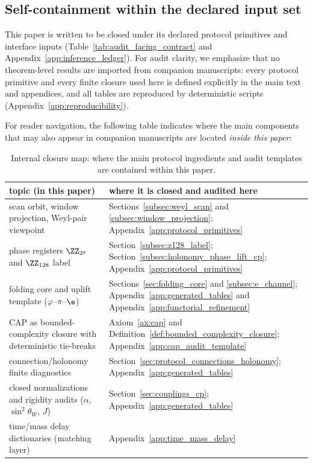\subsection{Self-containment within the declared input set}
This paper is written to be closed under its declared protocol primitives and interface inputs (Table~\ref{tab:audit_facing_contract} and Appendix~\ref{app:inference_ledger}).
For audit clarity, we emphasize that no theorem-level results are imported from companion manuscripts: every protocol primitive and every finite closure used here is defined explicitly in the main text and appendices, and all tables are reproduced by deterministic scripts (Appendix~\ref{app:reproducibility}).

For reader navigation, the following table indicates where the main components that may also appear in companion manuscripts are located \emph{inside this paper}:
\begin{table}[t]
\centering
\scriptsize
\setlength{\tabcolsep}{6pt}
\renewcommand{\arraystretch}{1.15}
\begin{tabular}{p{} p{}}
\toprule
topic (in this paper) & where it is closed and audited here \\
\midrule
scan orbit, window projection, Weyl-pair viewpoint & Sections~\ref{subsec:weyl_scan} and \ref{subsec:window_projection}; Appendix~\ref{app:protocol_primitives} \\
phase registers $\ZZ_{2^p}$ and \texorpdfstring{$\ZZ_{128}$}{Z128} label & Section~\ref{subsec:z128_label}; Section~\ref{subsec:holonomy_phase_lift_cp}; Appendix~\ref{app:protocol_primitives} \\
folding core and uplift template ($\varphi$--$\pi$--$\e$) & Sections~\ref{sec:folding_core} and \ref{subsec:e_channel}; Appendix~\ref{app:generated_tables} and Appendix~\ref{app:functorial_refinement} \\
CAP as bounded-complexity closure with deterministic tie-breaks & Axiom~\ref{ax:cap} and Definition~\ref{def:bounded_complexity_closure}; Appendix~\ref{app:cap_audit_template} \\
connection/holonomy finite diagnostics & Section~\ref{sec:protocol_connections_holonomy}; Appendix~\ref{app:generated_tables} \\
closed normalizations and rigidity audits ($\alpha$, $\sin^2\theta_W$, $J$) & Section~\ref{sec:couplings_cp}; Appendix~\ref{app:generated_tables} \\
time/mass delay dictionaries (matching layer) & Appendix~\ref{app:time_mass_delay} \\
\bottomrule
\end{tabular}
\caption{Internal closure map: where the main protocol ingredients and audit templates are contained within this paper.}
\label{tab:internal_closure_map}
\end{table}

